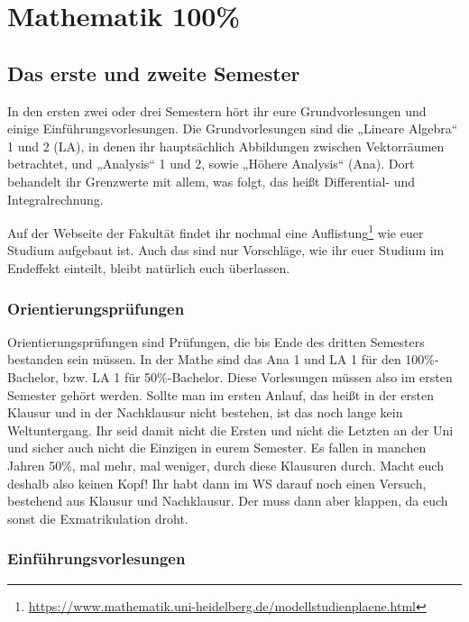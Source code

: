 \section{Mathematik 100\%}

\subsection{Das erste und zweite Semester}

In den ersten zwei oder drei Semestern hört ihr eure Grundvorlesungen und einige Einführungsvorlesungen. Die Grundvorlesungen sind die „Lineare Algebra“ 1 und 2 (\gls{LA}), in denen ihr hauptsächlich Abbildungen zwischen Vektorräumen betrachtet, und „Analysis“ 1 und 2, sowie „Höhere Analysis“ (\gls{Ana}). Dort behandelt ihr Grenzwerte mit allem, was folgt, das heißt Differential- und Integralrechnung.

Auf der Webseite der Fakultät findet ihr nochmal eine Auflistung\footnote[1]{\url{https://www.mathematik.uni-heidelberg.de/modellstudienplaene.html}} wie euer Studium aufgebaut ist. Auch das sind nur Vorschläge, wie ihr euer Studium im Endeffekt einteilt, bleibt natürlich euch überlassen.

\subsubsection{Orientierungsprüfungen}

Orientierungsprüfungen sind Prüfungen, die bis Ende des dritten Semesters bestanden sein müssen. In der Mathe sind das Ana 1 und LA 1 für den 100\%-Bachelor, bzw. LA 1 für 50\%-Bachelor. Diese Vorlesungen müssen also im ersten Semester gehört werden. Sollte man im ersten Anlauf, das heißt in der ersten Klausur und in der Nachklausur nicht bestehen, ist das noch lange kein Weltuntergang. Ihr seid damit nicht die Ersten und nicht die Letzten an der Uni und sicher auch nicht die Einzigen in eurem Semester. Es fallen in manchen Jahren 50\%, mal mehr, mal weniger, durch diese Klausuren durch. Macht euch deshalb also keinen Kopf! Ihr habt dann im WS darauf noch einen Versuch, bestehend aus Klausur und Nachklausur. Der muss dann aber klappen, da euch sonst die Exmatrikulation droht.

\subsubsection{Einführungsvorlesungen}

